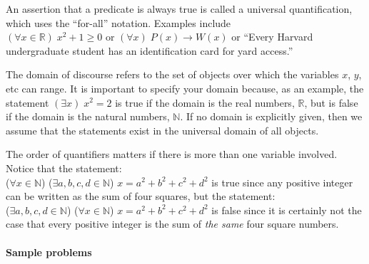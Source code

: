 \documentclass[12pt]{article}
\begin{document}
\begin{enumerate}
An assertion that a predicate is always true is called a universal quantification, which uses the ``for-all'' notation. Examples include\\
$(\forall x \in \mathbb{R}) \; x^2 + 1 \geq 0$ or $(\forall x) \; P(x) \rightarrow W(x)$ or ``Every Harvard undergraduate student has an identification card for yard access.''

The domain of discourse refers to the set of objects over which the variables $x$, $y$, etc can range. It is important to specify your domain because, as an example, the statement $(\exists x) \; x^2 = 2$ is true if the domain is the real numbers, $\mathbb{R}$, but is false if the domain is the natural numbers, $\mathbb{N}$. If no domain is explicitly given, then we assume that the statements exist in the universal domain of all objects.

The order of quantifiers matters if there is more than one variable involved. Notice that the statement:\\
($\forall x \in \mathbb{N}$) ($\exists a, b, c, d \in \mathbb{N}$) $x = a^2 + b^2 + c^2 + d^2$ is true since any positive integer can be written as the sum of four squares, but the statement:\\
($\exists a, b, c, d \in \mathbb{N}$) ($\forall x \in \mathbb{N}$) $x = a^2 + b^2 + c^2 + d^2$ is false since it is certainly not the case that every positive integer is the sum of \emph{the same} four square numbers.

\end{enumerate}







\pagebreak

\paragraph*{Sample problems}
\end{document}

